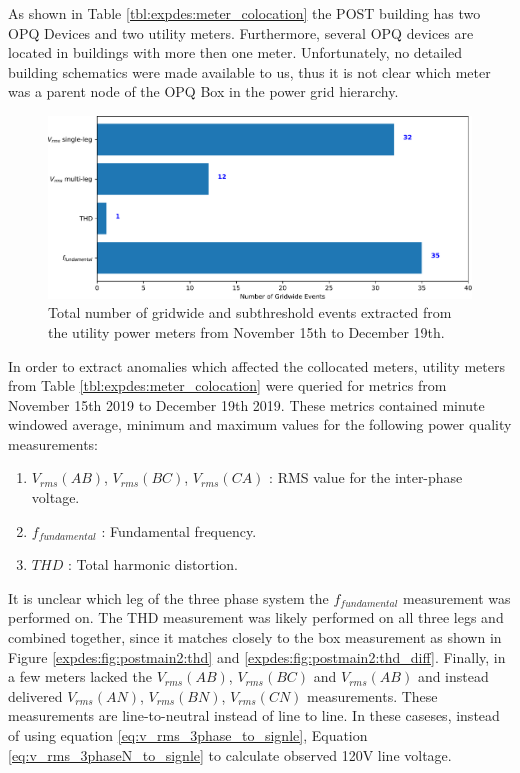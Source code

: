 As shown in Table \ref{tbl:expdes:meter_colocation} the POST building has two OPQ Devices and two utility meters.
Furthermore, several OPQ devices are located in buildings with more then one meter.
Unfortunately, no detailed building schematics were made available to us, thus it is not clear which meter was a parent node of the OPQ Box in the power grid hierarchy.

\begin{figure}[ht!]
    \centering
    \includegraphics[width=1\linewidth]{img/napali_eval/gt/utility_events_total.pdf}
    \caption{Total number of gridwide and subthreshold events extracted from the utility power meters from November 15th to December 19th.}
    \label{expdes:fig:postmain2:utility_event_total}
\end{figure}

In order to extract anomalies which affected the collocated meters, utility meters from Table \ref{tbl:expdes:meter_colocation} were queried for metrics from November 15th 2019 to December 19th 2019.
These metrics contained minute windowed average, minimum and maximum values for the following power quality measurements:
\begin{enumerate}
    \item $V_{rms}(AB)$, $V_{rms}(BC)$, $V_{rms}(CA)$ : RMS value for the inter-phase voltage.
    \item $f_{fundamental}$ : Fundamental frequency.
    \item $THD$ : Total harmonic distortion.
\end{enumerate}

It is unclear which leg of the three phase system the  $f_{fundamental}$ measurement was performed on.
The THD measurement was likely performed on all three legs and combined together, since it matches closely to the box measurement as shown in Figure \ref{expdes:fig:postmain2:thd} and \ref{expdes:fig:postmain2:thd_diff}.
Finally, in a few meters lacked the $V_{rms}(AB)$, $V_{rms}(BC)$ and $V_{rms}(AB)$ and instead delivered $V_{rms}(AN)$, $V_{rms}(BN)$, $V_{rms}(CN)$ measurements.
These measurements are line-to-neutral instead of line to line.
In these caseses, instead of using equation \ref{eq:v_rms_3phase_to_signle}, Equation \ref{eq:v_rms_3phaseN_to_signle} to calculate observed 120V line voltage. \cite{Horowitz:2015:AE:2960712}

